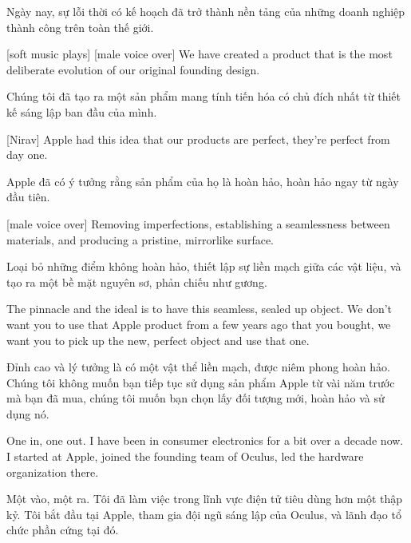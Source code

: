 \documentclass[a4paper]{article}
\begin{document}
	\begin{vietnamese-v2}
		 Ngày nay, sự lỗi thời có kế hoạch đã trở thành nền tảng của những doanh nghiệp thành công trên toàn thế giới.
	\end{vietnamese-v2}
	
	[soft music plays]
	[male voice over] We have created a product that is the most deliberate evolution of our original founding design.
	
	\begin{vietnamese-v2}
		 Chúng tôi đã tạo ra một sản phẩm mang tính tiến hóa có chủ đích nhất từ thiết kế sáng lập ban đầu của mình.
	\end{vietnamese-v2}
	
	[Nirav] Apple had this idea that our products are perfect, they're perfect from day one.
	
	\begin{vietnamese-v2}
		[Nirav] Apple đã có ý tưởng rằng sản phẩm của họ là hoàn hảo, hoàn hảo ngay từ ngày đầu tiên.
	\end{vietnamese-v2}
	
	[male voice over] Removing imperfections, establishing a seamlessness between materials, and producing a pristine, mirrorlike surface.

	\begin{vietnamese-v2}
		 Loại bỏ những điểm không hoàn hảo, thiết lập sự liền mạch giữa các vật liệu, và tạo ra một bề mặt nguyên sơ, phản chiếu như gương.
	\end{vietnamese-v2}

	The pinnacle and the ideal is to have this seamless, sealed up object.
	We don't want you to use that Apple product from a few years ago that you bought, we want you to pick up the new, perfect object and use that one.

	\begin{vietnamese-v2}
		Đỉnh cao và lý tưởng là có một vật thể liền mạch, được niêm phong hoàn hảo. 
		Chúng tôi không muốn bạn tiếp tục sử dụng sản phẩm Apple từ vài năm trước mà bạn đã mua, chúng tôi muốn bạn chọn lấy đối tượng mới, hoàn hảo và sử dụng nó.
	\end{vietnamese-v2}

	One in, one out.
	I have been in consumer electronics for a bit over a decade now.
	I started at Apple, joined the founding team of Oculus, led the hardware organization there.
	
	\begin{vietnamese-v2}
		Một vào, một ra. 
		Tôi đã làm việc trong lĩnh vực điện tử tiêu dùng hơn một thập kỷ. 
		Tôi bắt đầu tại Apple, tham gia đội ngũ sáng lập của Oculus, và lãnh đạo tổ chức phần cứng tại đó.
	\end{vietnamese-v2}
	
\end{document}
